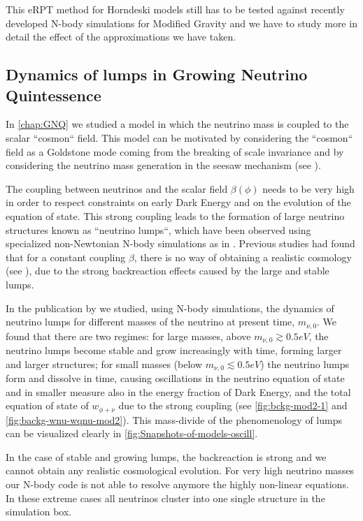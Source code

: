 This eRPT method for Horndeski models still has to be tested against recently developed N-body simulations for Modified Gravity and we have to
study more in detail the effect of the approximations we have taken.


\subsection*{Dynamics of lumps in Growing Neutrino Quintessence}

In \cref{chap:GNQ} we studied a model in which the neutrino mass is coupled to the scalar ``cosmon`` field.
This model can be motivated by considering the ``cosmon`` field as a Goldstone mode coming from the breaking
of scale invariance and by considering the neutrino mass generation in the seesaw mechanism (see \cite{wetterich_growing_2007}).

The coupling between neutrinos and the scalar field $\beta(\phi)$ needs to be very high in order to respect constraints on early Dark Energy and
on the evolution of the equation of state. This strong coupling leads to the formation of large neutrino structures known as ``neutrino lumps``, 
which have been observed using specialized non-Newtonian N-body simulations as in \cite{ayaita_structure_2012}.
Previous studies had found that for a constant coupling $\beta$, there is no way of obtaining a realistic cosmology (see \cite{fuhrer_backreaction_2015}),
due to the strong backreaction effects caused by the large and stable lumps.

In the publication by \citet{casas_dynamics_2016} we studied, using N-body simulations, the dynamics of neutrino lumps 
for different masses of the neutrino at present time, $m_{\nu,0}$.
We found that there are two regimes: for large masses, above $m_{\nu,0} \gtrsim 0.5 eV$, the neutrino lumps become 
stable and grow increasingly with time, forming larger and larger structures; for 
small masses (below $m_{\nu,0} \lesssim 0.5 eV$) the neutrino lumps form and dissolve in time,
causing oscillations in the neutrino equation of state and in smaller measure also in the energy fraction of Dark Energy, and the total equation 
of state of $w_{\phi+\nu}$ due to the strong coupling (see \cref{fig:bckg-mod2-1} and \cref{fig:backg-wnu-wqnu-mod2}).
This mass-divide of the phenomenology of lumps can be visualized clearly in \cref{fig:Snapshots-of-models-oscill}.

In the case of stable and growing lumps, the backreaction is strong and we cannot obtain any realistic cosmological evolution. 
For very high neutrino masses our N-body code is not able to resolve anymore the highly non-linear equations. In these
extreme cases all neutrinos cluster into one single structure in the simulation box.

